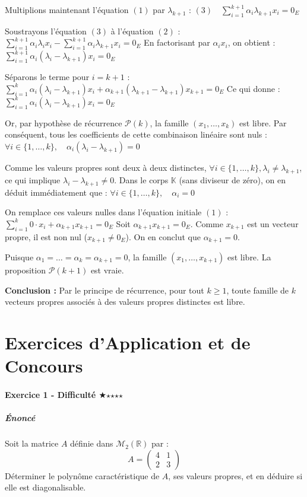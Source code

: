 \documentclass[11pt,a4paper]{article}
\begin{document}
Multiplions maintenant l'équation $(1)$ par $\lambda_{k+1}$ :
$(3) \quad \sum_{i=1}^{k+1} \alpha_i \lambda_{k+1} x_i = 0_E$

Soustrayons l'équation $(3)$ à l'équation $(2)$ :
$\sum_{i=1}^{k+1} \alpha_i \lambda_i x_i - \sum_{i=1}^{k+1} \alpha_i \lambda_{k+1} x_i = 0_E$
En factorisant par $\alpha_i x_i$, on obtient :
$\sum_{i=1}^{k+1} \alpha_i (\lambda_i - \lambda_{k+1}) x_i = 0_E$

Séparons le terme pour $i=k+1$ :
$\sum_{i=1}^{k} \alpha_i (\lambda_i - \lambda_{k+1}) x_i + \alpha_{k+1}(\lambda_{k+1} - \lambda_{k+1})x_{k+1} = 0_E$
Ce qui donne :
$\sum_{i=1}^{k} \alpha_i (\lambda_i - \lambda_{k+1}) x_i = 0_E$

Or, par hypothèse de récurrence $\mathcal{P}(k)$, la famille $(x_1, \dots, x_k)$ est libre.
Par conséquent, tous les coefficients de cette combinaison linéaire sont nuls :
$\forall i \in \{1, \dots, k\}, \quad \alpha_i (\lambda_i - \lambda_{k+1}) = 0$

Comme les valeurs propres sont deux à deux distinctes, $\forall i \in \{1, \dots, k\}, \lambda_i \neq \lambda_{k+1}$, ce qui implique $\lambda_i - \lambda_{k+1} \neq 0$.
Dans le corps $\mathbb{K}$ (sans diviseur de zéro), on en déduit immédiatement que :
$\forall i \in \{1, \dots, k\}, \quad \alpha_i = 0$

On remplace ces valeurs nulles dans l'équation initiale $(1)$ :
$\sum_{i=1}^{k} 0 \cdot x_i + \alpha_{k+1} x_{k+1} = 0_E$
Soit $\alpha_{k+1} x_{k+1} = 0_E$.
Comme $x_{k+1}$ est un vecteur propre, il est non nul ($x_{k+1} \neq 0_E$).
On en conclut que $\alpha_{k+1} = 0$.

Puisque $\alpha_1 = \dots = \alpha_k = \alpha_{k+1} = 0$, la famille $(x_1, \dots, x_{k+1})$ est libre.
La proposition $\mathcal{P}(k+1)$ est vraie.

\textbf{Conclusion :} Par le principe de récurrence, pour tout $k \geq 1$, toute famille de $k$ vecteurs propres associés à des valeurs propres distinctes est libre.


\newpage
\part{Exercices d'Application et de Concours}
\subsection*{Exercice 1 - Difficulté \quad $\bigstar$$\star$$\star$$\star$$\star$}

\subsubsection*{Énoncé}
Soit la matrice $A$ définie dans $\mathcal{M}_2(\mathbb{R})$ par :
$$A = \begin{pmatrix} 4 & 1 \\ 2 & 3 \end{pmatrix}$$
Déterminer le polynôme caractéristique de $A$, ses valeurs propres, et en déduire si elle est diagonalisable.
\end{document}
